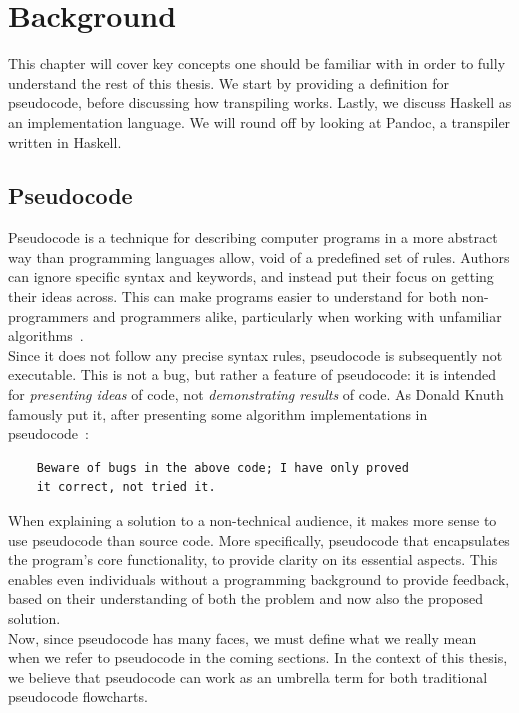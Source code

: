 \chapter{Background}

This chapter will cover key concepts one should be familiar with in order to fully understand the rest of this thesis. We start by providing a definition for pseudocode, before discussing how transpiling works. Lastly, we discuss Haskell as an implementation language. We will round off by looking at Pandoc, a transpiler written in Haskell.

\section{Pseudocode}

Pseudocode is a technique for describing computer programs in a more abstract way than programming languages allow, void of a predefined set of rules. Authors can ignore specific syntax and keywords, and instead put their focus on getting their ideas across. This can make programs easier to understand for both non-programmers and programmers alike, particularly when working with unfamiliar algorithms~\cite{whatIsPseudocode}. \\

Since it does not follow any precise syntax rules, pseudocode is subsequently not executable. This is not a bug, but rather a feature of pseudocode: it is intended for \textit{presenting ideas} of code, not \textit{demonstrating results} of code. As Donald Knuth famously put it, after presenting some algorithm implementations in pseudocode~\cite{famousKnuthQuote}:

\begin{verbatim}
    Beware of bugs in the above code; I have only proved
    it correct, not tried it.
\end{verbatim}

When explaining a solution to a non-technical audience, it makes more sense to use pseudocode than source code. More specifically, pseudocode that encapsulates the program's core functionality, to provide clarity on its essential aspects. This enables even individuals without a programming background to provide feedback, based on their understanding of both the problem and now also the proposed solution. \\

Now, since pseudocode has many faces, we must define what we really mean when we refer to pseudocode in the coming sections. In the context of this thesis, we believe that pseudocode can work as an umbrella term for both traditional pseudocode flowcharts.

